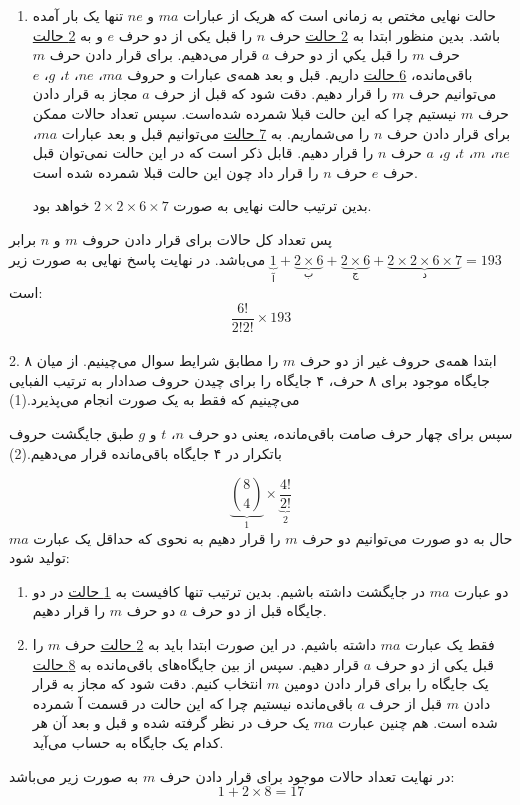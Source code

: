 \begin{enumerate}
      \item
      \p
      حالت نهایی مختص به زمانی است که هریک از عبارات $ma$ و $ne$ تنها یک بار آمده باشد.
      بدین منظور ابتدا به
      \underline{2 حالت}
      حرف 
      $n$
      را قبل یکی از دو حرف 
      $e$
      و به 
      \underline{2 حالت}  
      حرف  
      $m$
      را قبل يكي از دو حرف 
      $a$ 
      قرار می‌دهیم.
      برای قرار دادن حرف $m$ باقی‌مانده،
      \underline{6 حالت} 
       داریم.
      قبل و بعد همه‌ی عبارات و حروف 
      $ma$، $ne$، $t$، $g$، $e$
      می‌توانیم حرف $m$ را قرار دهیم.
      دقت شود که قبل از حرف $a$ مجاز به قرار دادن حرف $m$ نیستیم چرا که این حالت قبلا شمرده شده‌است.
      سپس تعداد حالات ممکن برای قرار دادن حرف $n$ را
      می‌شماریم. به 
      \underline{7 حالت}
      می‌توانیم قبل و بعد عبارات
      $ma$،
      $ne$،
      $m$،
      $t$، $g$، $a$
      حرف $n$ را قرار دهیم.
      قابل ذکر است که در این حالت نمی‌توان قبل حرف $e$
      حرف $n$ را قرار داد چون این حالت قبلا شمرده شده است.
      
      \p
      بدین ترتیب حالت نهایی به صورت 
      $2\times 2 \times 6 \times 7$
      خواهد بود.
    \end{enumerate}
    \p
    پس تعداد کل حالات برای قرار دادن حروف $m$ و $n$ برابر
    $\underbrace{1}_{\text{آ}} + \underbrace{2\times 6}_{\text{ب}} + \underbrace{2\times 6}_{\text{ج}}+ \underbrace{2\times 2 \times 6 \times 7}_{\text{د}}‌=‌193$
    می‌باشد.
    \p
    در نهایت پاسخ نهایی به صورت زیر است:
    $$\frac{6!}{2!2!} \times 193$$
    \\2.
    \p
    ابتدا همه‌ی حروف غیر از دو حرف $m$ را مطابق شرایط سوال می‌چینیم.
    از میان ۸ جایگاه موجود برای ۸ حرف، ۴ جایگاه را برای چیدن حروف صدادار به ترتیب الفبایی می‌چینیم که فقط به یک صورت انجام می‌پذیرد.(1)
    
    \p
    سپس برای چهار حرف صامت باقی‌مانده، یعنی دو حرف 
    $n$،
    $t$ و $g$
    طبق جایگشت حروف باتکرار در ۴ جایگاه باقی‌مانده قرار می‌دهیم.(2)
    
    $$\underbrace{{8\choose 4}}_{1} \times \underbrace{\frac{4!}{2!}}_{2}$$
    حال به دو صورت می‌توانیم دو حرف $m$ را قرار دهیم به نحوی که حداقل یک عبارت 
    $ma$ تولید شود:
    \begin{enumerate}
      \item 
      \p
      دو عبارت  $ma$  در جایگشت داشته باشیم.
       بدین ترتیب تنها کافیست به 
      \underline{1 حالت}
       در دو جایگاه قبل از دو حرف $a$ دو حرف $m$ را قرار دهیم.
      \item
      \p
      فقط یک عبارت $ma$ داشته‌ باشیم. 
      در این صورت ابتدا باید به
      \underline{2 حالت}
      حرف 
      $m$ 
      را قبل یکی از دو حرف 
      $a$ 
      قرار دهیم. 
      سپس از بین جایگاه‌های باقی‌مانده به
      \underline{8 حالت}
      یک جایگاه را برای قرار دادن دومین 
      $m$
      انتخاب کنیم. دقت شود که مجاز به قرار دادن 
      $m$
      قبل از حرف 
      $a$ 
      باقی‌مانده 
      نیستیم چرا که این حالت در قسمت آ شمرده شده است. هم چنین عبارت
      $ma$
    یک حرف در نظر گرفته شده و قبل و بعد آن هر کدام یک جایگاه به حساب می‌آید.
    \end{enumerate}
    \p
    در نهایت تعداد حالات موجود برای قرار دادن حرف $m$ به صورت زیر می‌باشد:
    $$1 + 2 \times 8= 17$$
    
